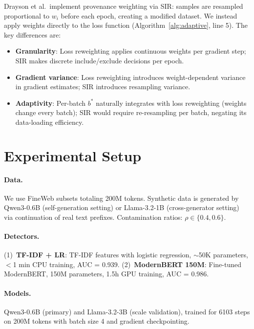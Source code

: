 \documentclass[11pt]{article}
\begin{document}
Drayson et al.\ implement provenance weighting via SIR: samples are resampled proportional to $w_i$ before each epoch, creating a modified dataset.
We instead apply weights directly to the loss function (Algorithm~\ref{alg:adaptive}, line 5).
The key differences are:
\begin{itemize}
    \item \textbf{Granularity}: Loss reweighting applies continuous weights per gradient step; SIR makes discrete include/exclude decisions per epoch.
    \item \textbf{Gradient variance}: Loss reweighting introduces weight-dependent variance in gradient estimates; SIR introduces resampling variance.
    \item \textbf{Adaptivity}: Per-batch $b^*$ naturally integrates with loss reweighting (weights change every batch); SIR would require re-resampling per batch, negating its data-loading efficiency.
\end{itemize}

\section{Experimental Setup}
\label{sec:setup}

\paragraph{Data.}
We use FineWeb subsets totaling 200M tokens.
Synthetic data is generated by Qwen3-0.6B (self-generation setting) or Llama-3.2-1B (cross-generator setting) via continuation of real text prefixes.
Contamination ratios: $\rho \in \{0.4, 0.6\}$.

\paragraph{Detectors.}
(1)~\textbf{TF-IDF + LR}: TF-IDF features with logistic regression, $\sim$50K parameters, $<$1 min CPU training, AUC = 0.939.
(2)~\textbf{ModernBERT 150M}: Fine-tuned ModernBERT, 150M parameters, 1.5h GPU training, AUC = 0.986.

\paragraph{Models.}
Qwen3-0.6B (primary) and Llama-3.2-3B (scale validation), trained for 6103 steps on 200M tokens with batch size 4 and gradient checkpointing.
\end{document}
